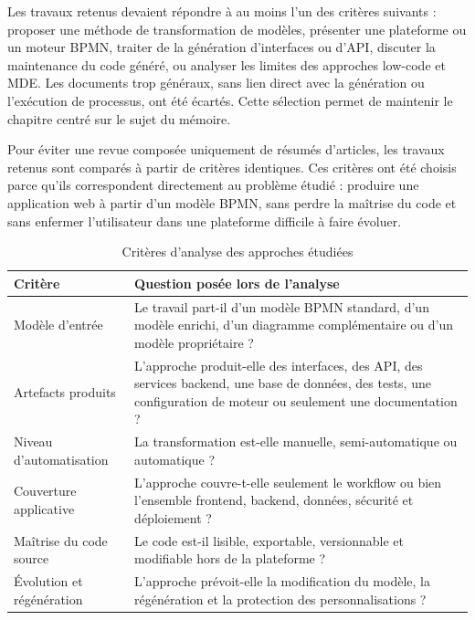 Les travaux retenus devaient répondre à au moins l'un des critères
suivants : proposer une méthode de transformation de modèles, présenter
une plateforme ou un moteur BPMN, traiter de la génération d'interfaces
ou d'API, discuter la maintenance du code généré, ou analyser les
limites des approches low-code et MDE. Les documents trop généraux, sans
lien direct avec la génération ou l'exécution de processus, ont été
écartés. Cette sélection permet de maintenir le chapitre centré sur le
sujet du mémoire.


Pour éviter une revue composée uniquement de résumés d'articles, les
travaux retenus sont comparés à partir de critères identiques. Ces
critères ont été choisis parce qu'ils correspondent directement au
problème étudié : produire une application web à partir d'un modèle
BPMN, sans perdre la maîtrise du code et sans enfermer l'utilisateur
dans une plateforme difficile à faire évoluer.

\begin{table}[H]
\caption{Critères d'analyse des approches étudiées}
\label{tab:criteres-analyse-approches}
\centering
\footnotesize
\renewcommand{\arraystretch}{1.2}
\begin{tabular}{|p{4.2cm}|p{9.0cm}|}
\hline
\textbf{Critère} & \textbf{Question posée lors de l'analyse} \\
\hline
Modèle d'entrée & Le travail part-il d'un modèle BPMN standard, d'un
modèle enrichi, d'un diagramme complémentaire ou d'un modèle
propriétaire ? \\
\hline
Artefacts produits & L'approche produit-elle des interfaces, des API,
des services backend, une base de données, des tests, une configuration
de moteur ou seulement une documentation ? \\
\hline
Niveau d'automatisation & La transformation est-elle manuelle,
semi-automatique ou automatique ? \\
\hline
Couverture applicative & L'approche couvre-t-elle seulement le workflow
ou bien l'ensemble frontend, backend, données, sécurité et déploiement
? \\
\hline
Maîtrise du code source & Le code est-il lisible, exportable,
versionnable et modifiable hors de la plateforme ? \\
\hline
Évolution et régénération & L'approche prévoit-elle la modification du
modèle, la régénération et la protection des personnalisations ? \\
\hline
\end{tabular}
\end{table}

